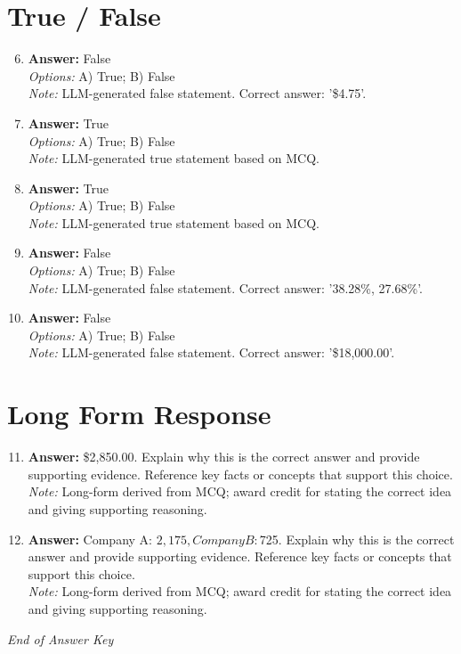 \documentclass[12pt]{article}
\begin{document}
\section*{True / False}
\begin{enumerate}[label=\arabic*.]
\setcounter{enumi}{5}
\item \textbf{Answer:} False
\\ \textit{Options:} A) True; B) False
\\ \textit{Note:} LLM-generated false statement. Correct answer: '\$4.75'.
\item \textbf{Answer:} True
\\ \textit{Options:} A) True; B) False
\\ \textit{Note:} LLM-generated true statement based on MCQ.
\item \textbf{Answer:} True
\\ \textit{Options:} A) True; B) False
\\ \textit{Note:} LLM-generated true statement based on MCQ.
\item \textbf{Answer:} False
\\ \textit{Options:} A) True; B) False
\\ \textit{Note:} LLM-generated false statement. Correct answer: '38.28\%, 27.68\%'.
\item \textbf{Answer:} False
\\ \textit{Options:} A) True; B) False
\\ \textit{Note:} LLM-generated false statement. Correct answer: '\$18,000.00'.
\end{enumerate}

\section*{Long Form Response}
\begin{enumerate}[label=\arabic*.]
\setcounter{enumi}{10}
\item \textbf{Answer:} \$2,850.00. Explain why this is the correct answer and provide supporting evidence. Reference key facts or concepts that support this choice.
\\ \textit{Note:} Long-form derived from MCQ; award credit for stating the correct idea and giving supporting reasoning.
\item \textbf{Answer:} Company A: $2,175, Company B: $725. Explain why this is the correct answer and provide supporting evidence. Reference key facts or concepts that support this choice.
\\ \textit{Note:} Long-form derived from MCQ; award credit for stating the correct idea and giving supporting reasoning.
\end{enumerate}

\vfill
\noindent\textit{End of Answer Key}
\end{document}
